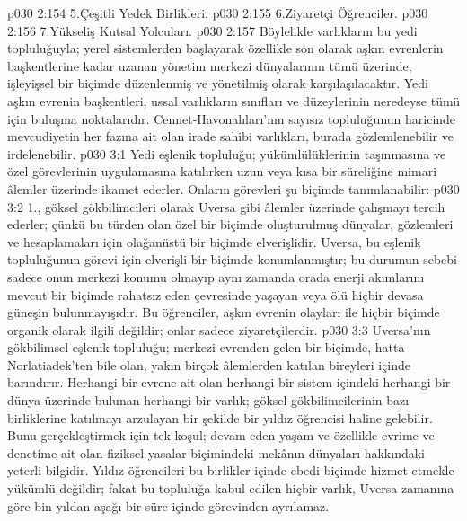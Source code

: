 \vs p030 2:154 5.\bibnobreakspace Çeşitli Yedek Birlikleri.
\vs p030 2:155 6.\bibnobreakspace Ziyaretçi Öğrenciler.
\vs p030 2:156 7.\bibnobreakspace Yükseliş Kutsal Yolcuları.
\vs p030 2:157 Böylelikle varlıkların bu yedi topluluğuyla; yerel sistemlerden başlayarak özellikle son olarak aşkın evrenlerin başkentlerine kadar uzanan yönetim merkezi dünyalarının tümü üzerinde, işleyişsel bir biçimde düzenlenmiş ve yönetilmiş olarak karşılaşılacaktır. Yedi aşkın evrenin başkentleri, ussal varlıkların sınıfları ve düzeylerinin neredeyse tümü için buluşma noktalarıdır. Cennet\hyp{}Havonalıları’nın sayısız topluluğunun haricinde mevcudiyetin her fazına ait olan irade sahibi varlıkları, burada gözlemlenebilir ve irdelenebilir.
\vs p030 3:1 Yedi eşlenik topluluğu; yükümlülüklerinin taşınmasına ve özel görevlerinin uygulamasına katılırken uzun veya kısa bir süreliğine mimari âlemler üzerinde ikamet ederler. Onların görevleri şu biçimde tanımlanabilir:
\vs p030 3:2 1.\bibnobreakspace {}, göksel gökbilimcileri olarak Uversa gibi âlemler üzerinde çalışmayı tercih ederler; çünkü bu türden olan özel bir biçimde oluşturulmuş dünyalar, gözlemleri ve hesaplamaları için olağanüstü bir biçimde elverişlidir. Uversa, bu eşlenik topluluğunun görevi için elverişli bir biçimde konumlanmıştır; bu durumun sebebi sadece onun merkezi konumu olmayıp aynı zamanda orada enerji akımlarını mevcut bir biçimde rahatsız eden çevresinde yaşayan veya ölü hiçbir devasa güneşin bulunmayışıdır. Bu öğrenciler, aşkın evrenin olayları ile hiçbir biçimde organik olarak ilgili değildir; onlar sadece ziyaretçilerdir.
\vs p030 3:3 Uversa’nın gökbilimsel eşlenik topluluğu; merkezi evrenden gelen bir biçimde, hatta Norlatiadek’ten bile olan, yakın birçok âlemlerden katılan bireyleri içinde barındırır. Herhangi bir evrene ait olan herhangi bir sistem içindeki herhangi bir dünya üzerinde bulunan herhangi bir varlık; göksel gökbilimcilerinin bazı birliklerine katılmayı arzulayan bir şekilde bir yıldız öğrencisi haline gelebilir. Bunu gerçekleştirmek için tek koşul; devam eden yaşam ve özellikle evrime ve denetime ait olan fiziksel yasalar biçimindeki mekânın dünyaları hakkındaki yeterli bilgidir. Yıldız öğrencileri bu birlikler içinde ebedi biçimde hizmet etmekle yükümlü değildir; fakat bu topluluğa kabul edilen hiçbir varlık, Uversa zamanına göre bin yıldan aşağı bir süre içinde görevinden ayrılamaz.
